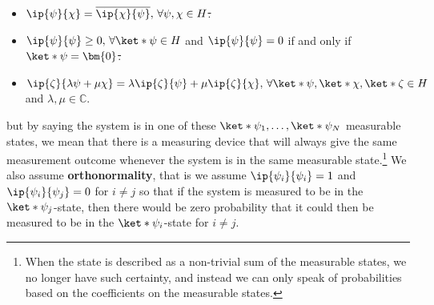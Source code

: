 \documentclass[12pt]{report}
\providecommand{\DIFadd}[1]{{\protect\color{blue}\uwave{#1}}} %
\providecommand{\DIFdel}[1]{{\protect\color{red}\sout{#1}}}                      %
\providecommand{\DIFaddbegin}{} %
\providecommand{\DIFaddend}{} %
\providecommand{\DIFdelbegin}{} %
\providecommand{\DIFdelend}{} %
\begin{document}
{\begin{itemize}[topsep=0pt]
{}\DIFdelend \DIFaddbegin \DIFadd{,
}\DIFaddend \item $\ip{\psi}{\chi}=\overline{\ip{\chi}{\psi}},\,\forall\psi,\chi\in H$\DIFdelbegin \DIFdel{.
}\DIFdelend \DIFaddbegin \DIFadd{,
}\DIFaddend \item $\ip{\psi}{\psi}\geq 0,\, \forall \ket*{\psi}\in H$ and $\ip{\psi}{\psi}=0$ if and only if $\ket*{\psi}=\bm{0}$\DIFdelbegin \DIFdel{.
}\DIFdelend \DIFaddbegin \DIFadd{,
}\DIFaddend \item $\ip{\zeta}{\lambda\psi+\mu\chi}=\lambda\ip{\zeta}{\psi}+\mu\ip{\zeta}{\chi},\,\forall \ket*{\psi},\ket*{\chi},\ket*{\zeta}\in H$ and  $\lambda,\mu\in\mathbb{C}$.
\end{itemize}} but by saying the system is in one of these $\ket*{\psi_1},\ldots,\ket*{\psi_N}$ measurable states, we mean that there is a measuring device that will always give the same measurement outcome whenever the system is in the same measurable state.\footnote{When the state is described as a non-trivial sum of the measurable states, we no longer have such certainty, and instead we can only speak of probabilities based on the coefficients on the measurable states.} We also assume \textbf{orthonormality}, that is we assume $\ip{\psi_i}{\psi_i}=1$ and $\ip{\psi_i}{\psi_j}=0$ for $i\neq j$ so that if the system is measured to be in the $\ket*{\psi_j}$-state, then there would be zero probability that it could then be measured to be in the $\ket*{\psi_i}$-state for $i\neq j$.  
\end{document}
